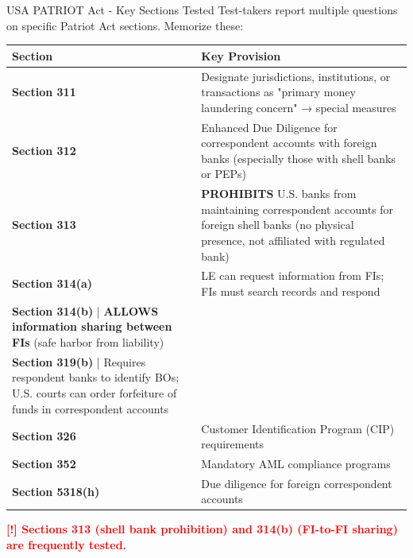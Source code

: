 \documentclass[11pt,a4paper]{beamer}
\newcommand{\redflag}[1]{\textcolor{red}{\textbf{[!] #1}}}
\begin{document}

\begin{frame}{USA PATRIOT Act - Key Sections Tested}
Test-takers report multiple questions on specific Patriot Act sections. Memorize these:
\begin{tabular}{p{}|p{}}
\hline
\rowcolor{lightgray}
\textbf{Section} & \textbf{Key Provision} \\
\hline
\textbf{Section 311} & Designate jurisdictions, institutions, or transactions as "primary money laundering concern" → special measures \\
\hline
\textbf{Section 312} & Enhanced Due Diligence for correspondent accounts with foreign banks (especially those with shell banks or PEPs) \\
\hline
\textbf{Section 313} & \textbf{PROHIBITS} U.S. banks from maintaining correspondent accounts for foreign shell banks (no physical presence, not affiliated with regulated bank) \\
\hline
\textbf{Section 314(a)} & LE can request information from FIs; FIs must search records and respond \\
\hline
\textbf{Section 314(b)} | \textbf{ALLOWS information sharing between FIs} (safe harbor from liability) \\
\hline
\textbf{Section 319(b)} | Requires respondent banks to identify BOs; U.S. courts can order forfeiture of funds in correspondent accounts \\
\hline
\textbf{Section 326} & Customer Identification Program (CIP) requirements \\
\hline
\textbf{Section 352} & Mandatory AML compliance programs \\
\hline
\textbf{Section 5318(h)} & Due diligence for foreign correspondent accounts \\
\hline
\end{tabular}
\redflag{Sections 313 (shell bank prohibition) and 314(b) (FI-to-FI sharing) are frequently tested.}
\end{frame}
\end{document}
